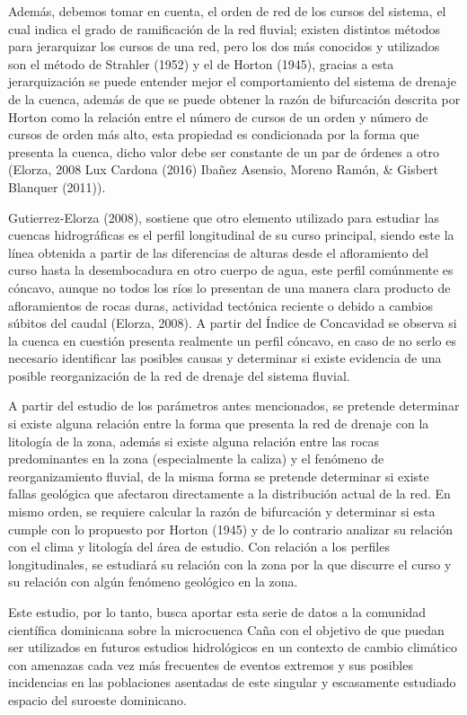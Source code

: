\documentclass[11pt,]{article}
\begin{document}
Además, debemos tomar en cuenta, el orden de red de los cursos del
sistema, el cual indica el grado de ramificación de la red fluvial;
existen distintos métodos para jerarquizar los cursos de una red, pero
los dos más conocidos y utilizados son el método de Strahler (1952) y el
de Horton (1945), gracias a esta jerarquización se puede entender mejor
el comportamiento del sistema de drenaje de la cuenca, además de que se
puede obtener la razón de bifurcación descrita por Horton como la
relación entre el número de cursos de un orden y número de cursos de
orden más alto, esta propiedad es condicionada por la forma que presenta
la cuenca, dicho valor debe ser constante de un par de órdenes a otro
(Elorza, 2008 Lux Cardona (2016) Ibañez Asensio, Moreno Ramón, \&
Gisbert Blanquer (2011)).

Gutierrez-Elorza (2008), sostiene que otro elemento utilizado para
estudiar las cuencas hidrográficas es el perfil longitudinal de su curso
principal, siendo este la línea obtenida a partir de las diferencias de
alturas desde el afloramiento del curso hasta la desembocadura en otro
cuerpo de agua, este perfil comúnmente es cóncavo, aunque no todos los
ríos lo presentan de una manera clara producto de afloramientos de rocas
duras, actividad tectónica reciente o debido a cambios súbitos del
caudal (Elorza, 2008). A partir del Índice de Concavidad se observa si
la cuenca en cuestión presenta realmente un perfil cóncavo, en caso de
no serlo es necesario identificar las posibles causas y determinar si
existe evidencia de una posible reorganización de la red de drenaje del
sistema fluvial.

A partir del estudio de los parámetros antes mencionados, se pretende
determinar si existe alguna relación entre la forma que presenta la red
de drenaje con la litología de la zona, además si existe alguna relación
entre las rocas predominantes en la zona (especialmente la caliza) y el
fenómeno de reorganizamiento fluvial, de la misma forma se pretende
determinar si existe fallas geológica que afectaron directamente a la
distribución actual de la red. En mismo orden, se requiere calcular la
razón de bifurcación y determinar si esta cumple con lo propuesto por
Horton (1945) y de lo contrario analizar su relación con el clima y
litología del área de estudio. Con relación a los perfiles
longitudinales, se estudiará su relación con la zona por la que discurre
el curso y su relación con algún fenómeno geológico en la zona.

Este estudio, por lo tanto, busca aportar esta serie de datos a la
comunidad científica dominicana sobre la microcuenca Caña con el
objetivo de que puedan ser utilizados en futuros estudios hidrológicos
en un contexto de cambio climático con amenazas cada vez más frecuentes
de eventos extremos y sus posibles incidencias en las poblaciones
asentadas de este singular y escasamente estudiado espacio del suroeste
dominicano.
\end{document}
